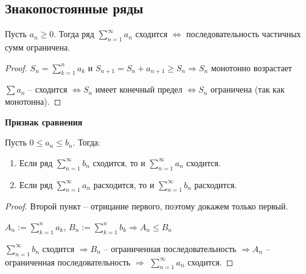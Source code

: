 \subsection{Знакопостоянные ряды}

\begin{theorem}
    Пусть $a_n\geq 0$. Тогда ряд $\sum\limits_{n=1}^\infty a_n$ сходится $\Leftrightarrow$ последовательность частичных сумм ограничена.
\end{theorem}

\begin{proof}
    $S_n=\sum\limits_{k=1}^n a_k$ и $S_{n+1}=S_n+a_{n + 1}\geq S_n\Rightarrow S_n$ монотонно возрастает

    $\sum a_n$ – сходится $\Leftrightarrow S_n$ имеет конечный предел $\Leftrightarrow S_n$ ограничена (так как монотонна).
\end{proof}

\begin{theorem}
    \textbf{Признак сравнения}

    Пусть $0\leq a_n\leq b_n$. Тогда:

    \begin{enumerate}
        \item Если ряд $\sum\limits_{n=1}^\infty b_n$ сходится, то и $\sum\limits_{n=1}^\infty a_n$ сходится.

        \item Если ряд $\sum\limits_{n=1}^\infty a_n$ расходится, то и $\sum\limits_{n=1}^\infty b_n$ расходится.
    \end{enumerate}
\end{theorem}

\begin{proof}
    Второй пункт – отрицание первого, поэтому докажем только первый.

    $A_n:=\sum\limits_{k=1}^n a_k$, $B_n:=\sum\limits_{k=1}^n b_k\Rightarrow A_n\leq B_n$

     $\sum\limits_{n=1}^\infty b_n$ сходится $\Rightarrow B_n$ – ограниченная последовательность $\Rightarrow A_n$ – ограниченная последовательность $\Rightarrow$ $\sum\limits_{n=1}^\infty a_n$ сходится.
\end{proof}

